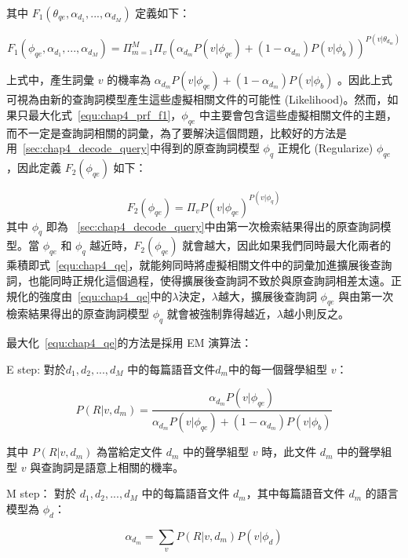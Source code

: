 其中 $F_1(\theta_{qe}, \alpha_{d_1}, ..., \alpha_{d_M})$ 定義如下：

\begin{equation}
\label{equ:chap4_prf_f1}
F_1(\phi_{qe}, \alpha_{d_1}, ..., \alpha_{d_M}) = \Pi^M_{m=1} \Pi_v (\alpha_{d_m} P(v|\phi_{qe}) + (1 - \alpha_{d_m}) P(v|\phi_b))^{P(v|\theta_{d_m})}
\end{equation}

上式中，產生詞彙 $v$ 的機率為 $\alpha_{d_m} P(v|\phi_{qe}) + (1-\alpha_{d_m}) P(v|\phi_b)$ 。因此上式可視為由新的查詢詞模型產生這些虛擬相關文件的可能性 (Likelihood)。然而，如果只最大化式~\ref{equ:chap4_prf_f1}，$\phi_{qe}$ 中主要會包含這些虛擬相關文件的主題，而不一定是查詢詞相關的詞彙，為了要解決這個問題，比較好的方法是用~\ref{sec:chap4_decode_query}中得到的原查詢詞模型 $\phi_q$ 正規化 (Regularize) $\phi_{qe}$，因此定義 $F_2(\phi_{qe})$ 如下：

\begin{equation}
F_2(\phi_{qe}) = \Pi_v P(v|\phi_{qe})^{P(v|\phi_q)}
\end{equation}
其中 $\phi_q$ 即為 ~\ref{sec:chap4_decode_query}中由第一次檢索結果得出的原查詢詞模型。當 $\phi_{qe}$ 和 $\phi_q$ 越近時，$F_2(\phi_{qe})$ 就會越大，因此如果我們同時最大化兩者的乘積即式~\ref{equ:chap4_qe}，就能夠同時將虛擬相關文件中的詞彙加進擴展後查詢詞，也能同時正規化這個過程，使得擴展後查詢詞不致於與原查詢詞相差太遠。正規化的強度由~\ref{equ:chap4_qe}中的$\lambda$決定，$\lambda$越大，擴展後查詢詞 $\phi_{qe}$ 與由第一次檢索結果得出的原查詢詞模型 $\phi_q$ 就會被強制靠得越近，$\lambda$越小則反之。

最大化~\ref{equ:chap4_qe}的方法是採用 EM 演算法：

E step: 對於${d_1, d_2, ..., d_M}$ 中的每篇語音文件$d_m$中的每一個聲學組型 $v$：

\begin{equation}
P(R|v, d_m) = \frac{\alpha_{d_m} P(v|\phi_{qe})}{\alpha_{d_m} P(v|\phi_{qe}) + (1-\alpha_{d_m}) P(v|\phi_b)}
\end{equation}

其中 $P(R|v, d_m)$ 為當給定文件 $d_m$ 中的聲學組型 $v$ 時，此文件 $d_m$ 中的聲學組型 $v$ 與查詢詞是語意上相關的機率。 

M step： 對於 ${d_1, d_2, ..., d_M}$ 中的每篇語音文件 $d_m$，其中每篇語音文件 $d_m$ 的語言模型為 $\phi_d$：

\begin{equation}
\alpha_{d_m} = \sum_v P(R|v, d_m)P(v|\phi_d)
\end{equation}

